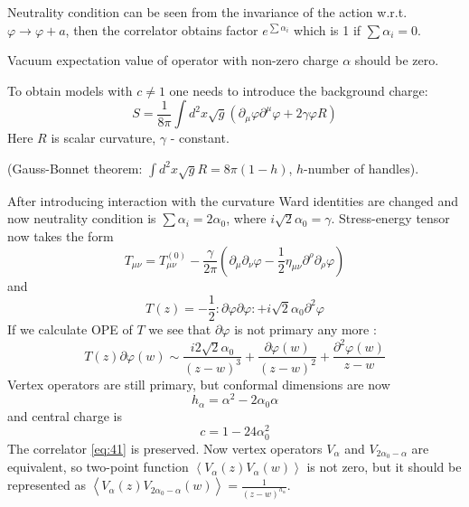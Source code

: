 \documentclass[a4paper,12pt]{article}
\theoremstyle{definition}
\theoremstyle{definition}
\theoremstyle{definition}
\begin{document}
Neutrality condition can be seen from the invariance of the action w.r.t. $\varphi\to\varphi+a$,
then the correlator obtains factor $e^{\sum \alpha_{i}}$ which is 1 if $\sum \alpha_{i}=0$.

Vacuum expectation value of operator with non-zero charge $\alpha$ should be zero. 

To obtain models with $c\neq 1$ one needs to introduce the background charge:
\begin{equation}
  \label{eq:44}
  S=\frac{1}{8\pi} \int d^{2}x \sqrt{g} (\partial_{\mu}\varphi\partial^{\mu}\varphi+2\gamma\varphi R)
\end{equation}
Here $R$ is scalar curvature, $\gamma$ - constant. 

(Gauss-Bonnet theorem: $\int d^{2}x \sqrt{g} R = 8\pi(1-h)$, $h$-number of handles).

After introducing interaction with the curvature Ward identities are changed and now neutrality
condition is $\sum \alpha_{i}=2\alpha_{0}$, where $i\sqrt{2}\alpha_{0}=\gamma$. 
Stress-energy tensor now takes the form
\begin{equation}
  \label{eq:45}
  T_{\mu\nu}=T^{(0)}_{\mu\nu}-\frac{\gamma}{2\pi}\left(\partial_{\mu}\partial_{\nu}\varphi-\frac{1}{2}\eta_{\mu\nu}\partial^{\rho}\partial_{\rho}\varphi\right)
\end{equation}
and
\begin{equation}
  \label{eq:46}
  T(z)=-\frac{1}{2}:\partial \varphi\partial\varphi:+i\sqrt{2}\alpha_{0}\partial^{2}\varphi
\end{equation}
If we calculate OPE of $T$ we see that $\partial\varphi$ is not primary any more \cite{difrancesco1997cft}:
\begin{equation}
  \label{eq:47}
  T(z)\partial\varphi(w)\sim
  \frac{i2\sqrt{2}\alpha_{0}}{(z-w)^{3}}+\frac{\partial\varphi(w)}{(z-w)^{2}} +\frac{\partial^{2}\varphi(w)}{z-w}
\end{equation}
Vertex operators are still primary, but conformal dimensions are now
\begin{equation}
  \label{eq:48}
  h_{\alpha}=\alpha^{2}-2\alpha_{0}\alpha
\end{equation}
and central charge is
\begin{equation}
  \label{eq:49}
  c=1-24\alpha_{0}^{2}
\end{equation}
The correlator \eqref{eq:41} is preserved. Now vertex operators $V_{\alpha}$ and
$V_{2\alpha_{0}-\alpha}$ are equivalent, so two-point function
$\left<V_{\alpha}(z)V_{\alpha}(w)\right>$  is not zero, but it should be represented as
$\left<V_{\alpha}(z)V_{2\alpha_{0}-\alpha}(w)\right>=\frac{1}{(z-w)^{h_{\alpha}}}$. 
\end{document}
